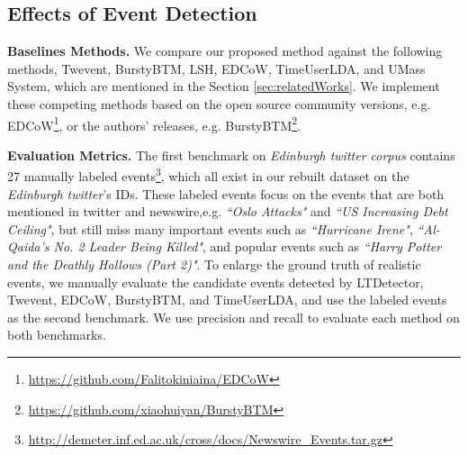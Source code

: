 \documentclass[runningheads,a4paper]{llncs}
\begin{document}
\subsection{Effects of Event Detection}
\textbf{Baselines Methods.} We compare our proposed method against the following methods, Twevent\cite{Twevent2012}, BurstyBTM\cite{Yan:2015wm}, LSH\cite{Petrovic:2010uj}, EDCoW\cite{Weng:2011wz}, TimeUserLDA\cite{Diao:2012wj}, and UMass System\cite{Allan:2000wu}, which are mentioned in the Section \ref{sec:relatedWorks}.
We implement these competing methods based on the open source community versions, e.g. EDCoW\footnote{\url{https://github.com/Falitokiniaina/EDCoW}}, or the authors' releases, e.g. BurstyBTM\footnote{\url{https://github.com/xiaohuiyan/BurstyBTM}}.

\textbf{Evaluation Metrics.} 
The first benchmark on \textit{Edinburgh twitter corpus} contains 27 manually labeled events\cite{petrovic2013can}\footnote{\url{http://demeter.inf.ed.ac.uk/cross/docs/Newswire_Events.tar.gz}}, which all exist in our rebuilt dataset on the \textit{Edinburgh twitter}'s IDs.
These labeled events focus on the events that are both mentioned in twitter and newswire,e.g. \textit{``Oslo Attacks"} and \textit{``US Increasing Debt Ceiling"}, but still miss many important events such as \textit{``Hurricane Irene"}, \textit{``Al-Qaida's No. 2 Leader Being Killed"}, and popular events such as \textit{``Harry Potter and the Deathly Hallows (Part 2)"}.
To enlarge the ground truth of realistic events, we manually evaluate the candidate events detected by LTDetector, Twevent, EDCoW, BurstyBTM, and TimeUserLDA, and  use the labeled events as the second benchmark.
We use precision and recall to evaluate each method on both benchmarks.
\end{document}
